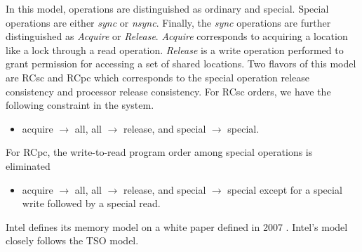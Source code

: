 \documentclass[a4paper, 11pt, twocolumn]{article}
\theoremstyle{nonumberplain}
\begin{document}
In this model, operations are distinguished as ordinary and special.
Special operations are either \textit{sync} or \textit{nsync}. Finally, the
\textit{sync} operations are further distinguished as \textit{Acquire} or
\textit{Release}. \textit{Acquire} corresponds to acquiring a location like
a lock through a read operation. \textit{Release} is a write operation 
performed to grant permission for accessing a set of shared locations.
Two flavors of this model are RCsc and RCpc which corresponds to the
special operation release consistency and processor release consistency.
For RCsc orders, we have the following constraint in the system.
\begin{itemize}
    \item acquire $\rightarrow$ all, all $\rightarrow$ release, and special
        $\rightarrow$ special.
\end{itemize}

For RCpc, the write-to-read program order among special operations is
eliminated

\begin{itemize}
    \item acquire $\rightarrow$ all, all $\rightarrow$ release, and special
        $\rightarrow$ special except for a special write followed by a special
        read.
\end{itemize}

Intel defines its memory model on a white paper defined in 2007 \cite{intel}.
Intel's model closely follows the TSO model. \\
\end{document}
